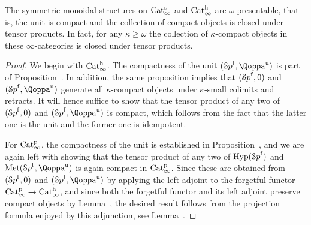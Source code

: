 \begin{corollary}
\label{corollary:omega-monoidal}%
The symmetric monoidal structures on $\mathrm{Cat}^{\mathrm p}_\infty$ and $\mathrm{Cat}^\mathrm{h}_\infty$ are $\omega$-presentable, that is, the unit is compact and the collection of compact objects is closed under tensor products. In fact, for any $\kappa \geq \omega$ the collection of $\kappa$-compact objects in these $\infty$-categories is closed under tensor products.
\end{corollary}
\begin{proof}
We begin with $\mathrm{Cat}^\mathrm{h}_\infty$. The compactness of the unit $(\Spaf,\QF^{\uni})$ is part of Proposition~.
In addition, the same proposition implies that $({\mathcal Sp}^{\mathrm{f}},0)$ and $(\Spaf,\QF^{\uni})$
generate all $\kappa$-compact objects under $\kappa$-small colimits and retracts. It will hence suffice to show that the tensor product of any two of $({\mathcal Sp}^{\mathrm{f}},0)$ and $(\Spaf,\QF^\uni)$ is compact, which follows from the fact that the latter one is the unit and the former one is idempotent.


For $\mathrm{Cat}^{\mathrm p}_\infty$, the compactness of the unit is established in Proposition~, and we are again left with showing that the tensor product of any two of $\operatorname{Hyp}({\mathcal Sp}^{\mathrm{f}})$ and $\Met(\Spaf,\QF^{\uni})$ is again compact in $\mathrm{Cat}^{\mathrm p}_\infty$. Since these are obtained from $({\mathcal Sp}^{\mathrm{f}},0)$ and $(\Spaf,\QF^\uni)$ by applying the left adjoint to the forgetful functor $\mathrm{Cat}^{\mathrm p}_\infty \to \mathrm{Cat}^\mathrm{h}_\infty$, and since both the forgetful functor and its left adjoint preserve compact objects by Lemma~, the desired result follows from the projection formula enjoyed by this adjunction, see Lemma~.
\end{proof}
